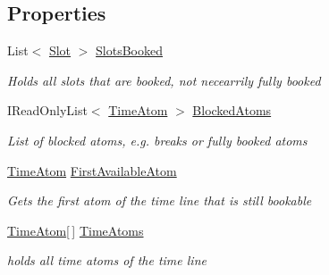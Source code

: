 \subsection*{Properties}
\begin{DoxyCompactItemize}
\item 
List$<$ \hyperlink{class_general_health_care_elements_1_1_booking_models_1_1_slot}{Slot} $>$ \hyperlink{class_general_health_care_elements_1_1_booking_models_1_1_single_per_day_time_line_a9824efe9d8f77e6c606e7d4a7e76e996}{Slots\+Booked}
\begin{DoxyCompactList}\small\item\em Holds all slots that are booked, not necearrily fully booked \end{DoxyCompactList}\item 
I\+Read\+Only\+List$<$ \hyperlink{class_general_health_care_elements_1_1_booking_models_1_1_time_atom}{Time\+Atom} $>$ \hyperlink{class_general_health_care_elements_1_1_booking_models_1_1_single_per_day_time_line_a1eb88578e99d8d8f2dfbb1afc187d037}{Blocked\+Atoms}
\begin{DoxyCompactList}\small\item\em List of blocked atoms, e.\+g. breaks or fully booked atoms \end{DoxyCompactList}\item 
\hyperlink{class_general_health_care_elements_1_1_booking_models_1_1_time_atom}{Time\+Atom} \hyperlink{class_general_health_care_elements_1_1_booking_models_1_1_single_per_day_time_line_a3605e90cfa9f8ba7e635e4f62debd5c4}{First\+Available\+Atom}
\begin{DoxyCompactList}\small\item\em Gets the first atom of the time line that is still bookable \end{DoxyCompactList}\item 
\hyperlink{class_general_health_care_elements_1_1_booking_models_1_1_time_atom}{Time\+Atom}\mbox{[}$\,$\mbox{]} \hyperlink{class_general_health_care_elements_1_1_booking_models_1_1_single_per_day_time_line_ab5f24ec2783b805510d1579fdbcf32aa}{Time\+Atoms}
\begin{DoxyCompactList}\small\item\em holds all time atoms of the time line \end{DoxyCompactList}\item 

\end{DoxyCompactItemize}
